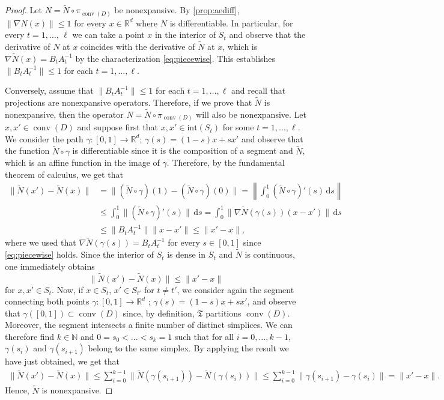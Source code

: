 \documentclass[onefignum,onetabnum]{siamonline250211}
\newcommand{\R}{\mathbb{R}}
\newcommand{\conv}{\operatorname{conv}}
\begin{document}
\begin{proof}
Let $N=\tilde{N}\circ\pi_{\conv(D)}$ be nonexpansive. By \cref{prop:aediff}, $\|\nabla N(x)\|\leq 1$ for every $x\in\R^d$ where $N$ is differentiable. In particular, for every $t=1,\dots, \, \ell$ we can take a point $x$ in the interior of $S_t$ and observe that the derivative of $N$ at $x$ coincides with the derivative of $\tilde{N}$ at $x$, which is $\nabla\tilde{N}(x)=B_tA_t^{-1}$ by the characterization \cref{eq:piecewise}. This establishes $\|B_tA_t^{-1}\|\leq 1$ for each $t=1,\ldots, \ell$.

Conversely, assume that $\|B_tA_t^{-1}\|\leq 1$ for each $t=1,\ldots, \ell$ and recall that projections are nonexpansive operators. Therefore, if we prove that $\tilde{N}$ is nonexpansive, then the operator $N=\tilde{N}\circ\pi_{\conv(D)}$ will also be nonexpansive. Let $x, x'\in\conv(D)$ and suppose first that  $x, x'\in \mathrm{int}(S_t)$ for some $t=1,\ldots,\ell$. We consider the path $\gamma:[0,1]\to\R^d$; $\gamma(s)=(1-s)x+sx'$ and observe that the function $\tilde{N}\circ\gamma$ is differentiable since it is the composition of a segment and  $\tilde{N}$, which is an affine function in the image of $\gamma$. Therefore, by the fundamental theorem of calculus, we get that
\begin{align*}
\|\tilde{N}(x')-\tilde{N}(x)\|&=\|(\tilde{N}\circ\gamma)(1)-(\tilde{N}\circ\gamma)(0)\|=\left\|\int_0^1 (\tilde{N}\circ\gamma)'(s) \, \mathrm{d}s\right\|\\
&\leq \int_0^1\|(\tilde{N}\circ\gamma)'(s)\| \, \mathrm{d}s=\int_0^1\|\nabla\tilde{N}(\gamma(s))(x-x')\| \, \mathrm{d}s\\
&\leq \|B_tA_t^{-1}\|\|x-x'\|\leq \|x'-x\|,
\end{align*}
where we used that $\nabla \tilde{N}(\gamma(s))=B_tA_t^{-1}$ for every $s\in[0,1]$ since \cref{eq:piecewise} holds. Since the interior of $S_t$ is dense in $S_t$ and $\tilde{N}$ is continuous, one immediately obtains
$$
\|\tilde{N}(x')-\tilde{N}(x)\|\leq \|x'-x\|
$$ 
for $x,x'\in S_t$. Now, if $x\in S_t$, $x'\in S_{t'}$ for $t\neq t'$, we consider again the segment connecting both points $\gamma:[0,1]\to\R^d$ ; $\gamma(s)=(1-s)x+sx'$, and observe that $\gamma([0, 1])\subset\conv(D)$ since, by definition, $\mathfrak{T}$ partitions $\conv(D)$. Moreover, the segment intersects a finite number of distinct simplices. We can therefore find $k\in\mathbb{N}$ and $0=s_0<...<s_k=1$ such that for all $i=0,\ldots,k-1$, $\gamma(s_i)$ and $\gamma(s_{i+1})$ belong to the same simplex. By applying the result we have just obtained, we get that
\begin{align*}
\|\tilde{N}(x')-\tilde{N}(x)\|\leq \sum_{i=0}^{k-1}\|\tilde N(\gamma(s_{i+1}))-\tilde N(\gamma(s_i))\|
\leq \sum_{i=0}^{k-1} \|\gamma(s_{i+1})-\gamma(s_i)\|
=\|x'-x\|.
\end{align*}
Hence, $\tilde{N}$ is nonexpansive.
\end{proof}
\end{document}
